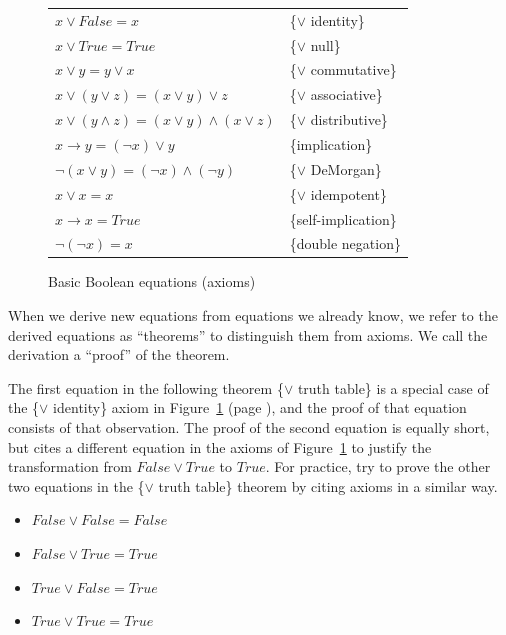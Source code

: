 \begin{figure}
\begin{center}
\begin{tabular}{ll}
$x \vee False = x$                                   & \{$\vee$ identity\} \\
$x \vee True = True$                                 & \{$\vee$ null\} \\
$x \vee y = y \vee x$                                & \{$\vee$ commutative\} \\
$x \vee (y \vee z) = (x \vee y) \vee z$              & \{$\vee$ associative\} \\
$x \vee (y \wedge z) = (x \vee y) \wedge (x \vee z)$ & \{$\vee$ distributive\} \\
$x \rightarrow y = (\neg x) \vee y$                  & \{implication\} \\
$\neg(x \vee y) = (\neg x) \wedge (\neg y)$          & \{$\vee$ DeMorgan\} \\
$x \vee x = x$                                       & \{$\vee$ idempotent\} \\
$x \rightarrow x = True$                             & \{self-implication\} \\
$\neg(\neg x)  = x$                                  & \{double negation\} \\
\end{tabular}
\end{center}
\caption{Basic Boolean equations (axioms)}
\label{fig-02-03}
\end{figure}

When we derive new equations from equations we already know,
we refer to the derived equations as ``theorems'' to
distinguish them from axioms. We call the derivation a
``proof'' of the theorem.

The first equation in the
following theorem \{$\vee$ truth table\} is a special case of the
\{$\vee$ identity\} axiom in Figure~\ref{fig-02-03} (page \pageref{fig-02-03}),
and the proof of that equation consists of that observation. The proof of the
second equation is equally short, but cites
a different equation in the axioms of Figure~\ref{fig-02-03}
to justify the transformation from $False \vee True$
to $True$.
For practice, try to prove the other two
equations in the \{$\vee$ truth table\} theorem by citing axioms
in a similar way.

\label{or-truth-table}
\begin{theorem}
\mbox{}
\begin{itemize}
\item $False \vee False = False$
\item $False \vee True  = True$
\item $True  \vee False = True$
\item $True  \vee True  = True$
\end{itemize}
\end{theorem}

